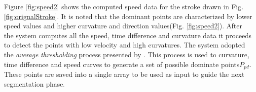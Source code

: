 \documentclass[a4paper,10pt]{IEEEconf}
\begin{document}
 Figure \ref{fig:speed2} shows the computed speed data for the stroke drawn in Fig. \ref{fig:orignalStroke}. %
 It is noted that the dominant points are characterized by lower speed values and higher curvature and direction values(Fig. \ref{fig:speed2}). %
After the system computes all the speed, time difference and curvature data it proceeds to detect the points with low velocity and high curvatures. The system adopted the \textsl{average thresholding} process presented by \cite{earlyprocess}. This process is used to curvature, time difference and speed curves to generate a set of possible dominate points$P_{pd}$. These points are saved into a single array to be used as input to guide the next segmentation phase. %
\end{document}
